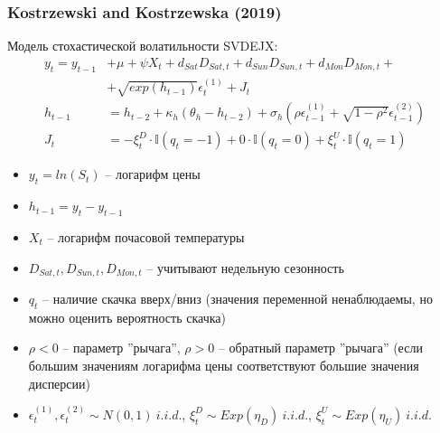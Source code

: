 \documentclass[c, dvipsnames]{beamer}  %
\begin{document}
\begin{frame}[shrink=5]
\frametitle{Kostrzewski and Kostrzewska (2019)} 

Модель стохастической волатильности SVDEJX: 
\begin{align*}
y_{t} = y_{ t-1} & + \mu + \psi X_{ t }+ d_{ Sat} D_{ Sat,t} + d_{ Sun }D_{ Sun,t} + d_{ Mon }D_{ Mon,t} +  \\ & + \sqrt{exp(h_{ t-1} )}\epsilon_{ t }^{(1)}+ J _{t }\\
h_{t-1} &= h_{ t-2} + \kappa_{ h} (\theta_{ h} - h_{ t-2} ) + \sigma_{ h} (\rho \epsilon_{ t-1}^{(1)} + \sqrt{1 - \rho^2} \epsilon_{ t-1}^{(2)}) \\
J_{ t} &= -\xi_{ t}^D \cdot \mathbb{I}(q_{ t} = -1) + 0 \cdot \mathbb{I} (q_{ t} = 0) + \xi_{ t}^U \cdot \mathbb{I} (q_{ t} = 1)
\end{align*}

\footnotesize{
\begin{itemize}


	\item $y_{ t} = ln(S_{ t})$ --  логарифм цены

\item  $h_{t-1} = y_{t} - y_{ t-1}$ 


\item  $X_{ t}$ -- логарифм почасовой температуры

\item  $D_{ Sat, t}, D_{ Sun, t}, D_{ Mon, t}$  -- учитывают недельную сезонность

\item $q_{t}$ -- наличие скачка вверх/вниз (значения переменной ненаблюдаемы, но можно оценить вероятность скачка)


\item  $\rho < 0$ -- параметр ''рычага'', $\rho > 0$ -- обратный параметр ''рычага'' (если большим значениям логарифма цены  соответствуют большие значения дисперсии)

\item  $\epsilon_{ t }^{(1)}, \epsilon_{ t }^{(2)} \sim N(0,1) \ i.i.d.$, $\xi_{ t}^D \sim Exp(\eta_D) \ i.i.d. $,  
$\xi_{ t}^U \sim Exp(\eta_U) \ i.i.d.$


\end{itemize}

}
\end{frame}
\end{document}
